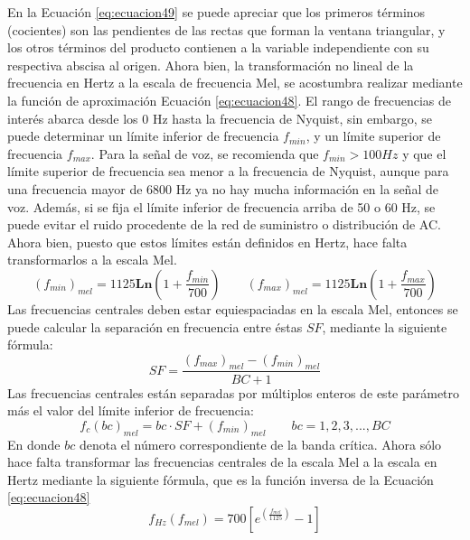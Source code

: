 \begin{enumerate}
\begin{enumerate}
En la Ecuación \eqref{eq:ecuacion49} se puede apreciar que los primeros términos (cocientes) son las pendientes de las rectas que forman la ventana triangular, y los otros términos del producto contienen a la variable independiente con su respectiva abscisa al origen. Ahora bien, la transformación no lineal de la frecuencia en Hertz a la escala de frecuencia Mel, se acostumbra realizar mediante la función de aproximación Ecuación \eqref{eq:ecuacion48}.
\vskip 0.5cm
El rango de frecuencias de interés abarca desde los 0 Hz hasta la frecuencia de Nyquist, sin embargo, se puede determinar un límite inferior de frecuencia $f_{min}$, y un límite superior de frecuencia $f_{max}$. Para la señal de voz, se recomienda que $f_{min} > 100 Hz$ y que el límite superior de frecuencia sea menor a la frecuencia de Nyquist, aunque para una frecuencia mayor de 6800 Hz ya no hay mucha información en la señal de voz. Además, si se fija el límite inferior de frecuencia arriba de 50 o 60 Hz, se puede evitar el ruido procedente de la red de suministro o distribución de AC. Ahora bien, puesto que estos límites están definidos en Hertz, hace falta transformarlos a la escala Mel.
\begin{equation}
\label{eq:ecuacion50}
\left ( f_{min} \right )_{mel} = 1125\mathbf{Ln}\left ( 1 + \frac{f_{min}}{700} \right )
\qquad
\left ( f_{max} \right )_{mel} = 1125\mathbf{Ln}\left ( 1 + \frac{f_{max}}{700} \right )
\end{equation}
Las frecuencias centrales deben estar equiespaciadas en la escala Mel, entonces se puede calcular la separación en frecuencia entre éstas $SF$, mediante la siguiente fórmula:
\begin{equation}
\label{eq:ecuacion51}
SF = \frac{\left ( f_{max} \right )_{mel} - \left ( f_{min} \right )_{mel}}{BC + 1}
\end{equation}
\newpage
Las frecuencias centrales están separadas por múltiplos enteros de este parámetro más el valor del límite inferior de frecuencia:
\begin{equation}
\label{eq:ecuacion52}
f_{c}(bc)_{mel} = bc \cdot SF + \left ( f_{min} \right )_{mel}
\qquad
bc = 1,2,3,...,BC
\end{equation}
En donde $bc$ denota el número correspondiente de la banda crítica. Ahora sólo hace falta transformar las frecuencias centrales de la escala Mel a la escala en Hertz mediante la siguiente fórmula, que es la función inversa de la Ecuación \eqref{eq:ecuacion48}
\begin{equation}
\label{eq:ecuacion53}
f_{Hz}(f_{mel}) = 700\left [ e^{\left ( \frac{f_{mel}}{1125} \right )} - 1 \right]

\end{equation}
\end{enumerate}
\end{enumerate}
